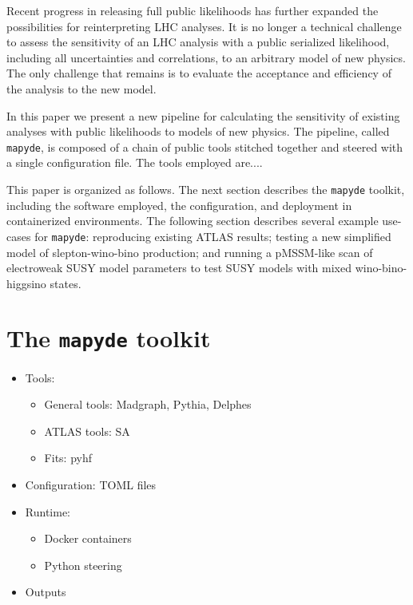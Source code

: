 \documentclass{article}
\newcommand{\mapyde}{\texttt{mapyde}}
\begin{document}
Recent progress in releasing full public likelihoods has further expanded the possibilities for reinterpreting LHC analyses.  It is no longer a technical challenge to assess the sensitivity of an LHC analysis with a public serialized likelihood, including all uncertainties and correlations, to an arbitrary model of new physics.  The only challenge that remains is to evaluate the acceptance and efficiency of the analysis to the new model.

In this paper we present a new pipeline for calculating the sensitivity of existing analyses with public likelihoods to models of new physics.  The pipeline, called \mapyde, is composed of a chain of public tools stitched together and steered with a single configuration file.  The tools employed are....

This paper is organized as follows.  The next section describes the \mapyde{} toolkit, including the software employed, the configuration, and deployment in containerized environments.  The following section describes several example use-cases for \mapyde: reproducing existing ATLAS results; testing a new simplified model of slepton-wino-bino production; and running a pMSSM-like scan of electroweak SUSY model parameters to test SUSY models with mixed wino-bino-higgsino states.

\section{The \mapyde{} toolkit}
\label{sec:the-toolkit}

\begin{itemize}
\item Tools:
  \begin{itemize}
  \item General tools: Madgraph, Pythia, Delphes
  \item ATLAS tools: SA
  \item Fits: pyhf
  \end{itemize}
\item Configuration: TOML files
\item Runtime:
  \begin{itemize}
  \item Docker containers
  \item Python steering
  \end{itemize}
\item Outputs
\end{itemize}
\end{document}
